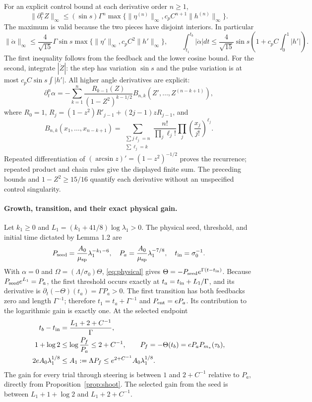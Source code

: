 \documentclass[11pt]{article}
\begin{document}
For an explicit control bound at each derivative order $n\geq1$,
\[
 \|\partial_t^n Z\|_\infty\leq
 (\sin s)\Gamma^n
 \max\{\|\eta^{(n)}\|_\infty,c_pC^{n+1}\|h^{(n)}\|_\infty\}.
\]
The maximum is valid because the two pieces have disjoint interiors.
In particular
\[
 \|\dot\alpha\|_\infty\leq\frac4{\sqrt{15}}\Gamma\sin s
 \max\{\|\eta'\|_\infty,c_pC^2\|h'\|_\infty\},\qquad
 \int_{t_1}^{t_b}|\dot\alpha|dt\leq
 \frac4{\sqrt{15}}\sin s\left(1+c_pC\int_0^1|h'|\right).
\]
The first inequality follows from the feedback and the lower cosine
bound. For the second, integrate $|\dot Z|$: the step has variation
$\sin s$ and the pulse variation is at most
$c_pC\sin s\int|h'|$. All higher angle derivatives are explicit:
\[
 \partial_t^n\alpha=-\sum_{k=1}^n
 \frac{R_{k-1}(Z)}{(1-Z^2)^{k-1/2}}
 B_{n,k}(Z',\ldots,Z^{(n-k+1)}),
\]
where $R_0=1$, $R_j=(1-z^2)R'_{j-1}+(2j-1)zR_{j-1}$, and
\[
 B_{n,k}(x_1,\ldots,x_{n-k+1})=
 \sum_{\substack{\sum j\ell_j=n\\\sum\ell_j=k}}
 \frac{n!}{\prod_j\ell_j!}\prod_j\left(\frac{x_j}{j!}\right)^{\ell_j}.
\]
Repeated differentiation of $(\arcsin z)'=(1-z^2)^{-1/2}$ proves
the recurrence; repeated product and chain rules give the displayed
finite sum. The preceding bounds and $1-Z^2\geq15/16$ quantify each
derivative without an unspecified control singularity.

\paragraph{Growth, transition, and their exact physical gain.}
Let $k_1\geq0$ and $L_1=(k_1+41/8)\log\lambda _1>0$.
The physical seed, threshold, and initial time dictated by Lemma 1.2 are
\[
 P_{\rm seed}=\frac{A_0}{\mu_{\rm sp}}\lambda _1^{-k_1-6},\quad
 P_a=\frac{A_0}{\mu_{\rm sp}}\lambda _1^{-7/8},\quad
 t_{\rm in}=\sigma _0^{-1}.
\]
With $\alpha=0$ and $\Omega=(\Lambda/\sigma _0)\Theta$,
\eqref{eq:physical} gives
$\Theta=-P_{\rm seed}e^{\Gamma(t-t_{\rm in})}$.
Because $P_{\rm seed}e^{L_1}=P_a$, the first threshold occurs exactly at
$t_a=t_{\rm in}+L_1/\Gamma$, and its derivative is
$\partial_t(-\Theta)(t_a)=\Gamma P_a>0$.
The first transition has both feedbacks zero and length $\Gamma^{-1}$;
therefore $t_1=t_a+\Gamma^{-1}$ and $P_{\rm ent}=eP_a$.
Its contribution to the logarithmic gain is exactly one.
At the selected endpoint
\begin{align}
 t_b-t_{\rm in}&=\frac{L_1+2+C^{-1}}\Gamma,\\
 1+\log2&\leq\log\frac{P_f}{P_a}\leq2+C^{-1},
 \qquad P_f=-\Theta(t_b)=eP_aP_{m_*}(\tau_b),\\
 2eA_0\lambda _1^{1/8}&\leq A_1:=\Lambda P_f
 \leq e^{2+C^{-1}}A_0\lambda _1^{1/8}.
\end{align}
The gain for every trial through steering is between $1$ and
$2+C^{-1}$ relative to $P_a$, directly from Proposition~\ref{prop:shoot}.
The selected gain from the seed is between
$L_1+1+\log2$ and $L_1+2+C^{-1}$.
\end{document}
